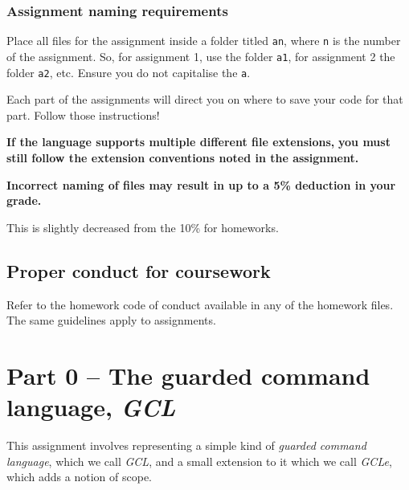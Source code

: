 \documentclass[11pt]{article}
\theoremstyle{definition}
\begin{document}
\subsubsection*{Assignment naming requirements}
\label{sec:org6fd5192}

Place all files for the assignment
inside a folder titled \texttt{an}, where \texttt{n} is the number of the assignment.
So, for assignment 1, use the folder \texttt{a1}, for assignment 2 the folder \texttt{a2}, etc.
Ensure you do not capitalise the \texttt{a}.

Each part of the assignments will direct you on where to
save your code for that part. Follow those instructions!

\begin{center}
\textbf{If the language supports multiple different file extensions,}
\textbf{you must still follow the extension conventions noted in the assignment.}
\end{center}

\begin{center}
\textbf{Incorrect naming of files may result in up to a 5\% deduction in your grade.}
\end{center}
This is slightly decreased from the 10\% for homeworks.

\subsection*{Proper conduct for coursework}
\label{sec:orgf0f1398}
Refer to the homework code of conduct available in any of the homework files.
The same guidelines apply to assignments.

\section*{Part 0 – The guarded command language, \emph{GCL}}
\label{sec:orgb6e7e5a}
This assignment involves representing a simple
kind of \emph{guarded command language}, which we call \emph{GCL},
and a small extension to it which we call \emph{GCLe},
which adds a notion of scope.
\end{document}
